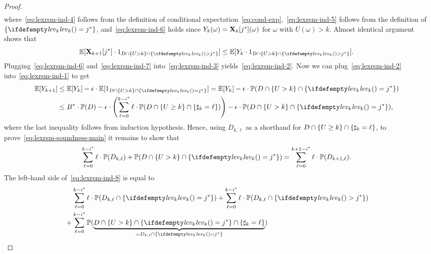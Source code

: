 \begin{proof}
\begin{align}
\end{align}
where~\eqref{eq:lexrsm-ind-4} follows from the definition of conditional expectation~\eqref{eq:cond-exp},~\eqref{eq:lexrsm-ind-5} follows from the definition of $\{\levelrank{}{k}=\fixn{j}\}$, and~\eqref{eq:lexrsm-ind-6} holds since $Y_k(\omega)=\mathbf{X}_{k}[{j}^*](\omega)$ for $\omega$ with $U(\omega)> k$. Almost identical argument shows that
\begin{equation}
\label{eq:lexrsm-ind-7}
\E[\vecseq{X}{k+1}{\fixn{j}}\cdot \indicator{D\cap \{U > k \} \cap \{\levelrank{}{k}>\fixn{j} \} }] \leq \E[Y_k\cdot \indicator{D\cap \{U > k \} \cap \{\levelrank{}{k}>\fixn{j} \}}].
\end{equation}
Plugging~\eqref{eq:lexrsm-ind-6} and~\eqref{eq:lexrsm-ind-7} into~\eqref{eq:lexrsm-ind-3} yields~\eqref{eq:lexrsm-ind-2}. Now we can plug~\eqref{eq:lexrsm-ind-2} into~\eqref{eq:lexrsm-ind-1} to get
\begin{align}
\E[Y_{k+1}]&\leq \E[Y_k] - \eps\cdot \E[\indicator{D \cap \{U>k\} \cap \{\levelrank{}{k} = \fixn{j} \} }] = \E[Y_k] - \eps\cdot \probm(D \cap \{U>k\} \cap \{\levelrank{}{k} = \fixn{j} \} ) \nonumber\\
&\leq \fixn{B}\cdot \probm(D) - \eps\cdot\left(\sum_{\ell=0}^{k-\fixn{i}} \ell\cdot\probm(D 
\cap \{U\geq k\} \cap \{\noofdec_k = \ell\})\right) -\eps\cdot \probm(D \cap \{U>k\} \cap \{\levelrank{}{k} = \fixn{j} \}),
\end{align}
where the last inequality follows from induction hypothesis. Hence, using $D_{k,\ell}$ as a shorthand for $D 
\cap \{U\geq k\} \cap \{\sharp_k = \ell\}$, to prove~\eqref{eq:lexrsm-soundness-main} it remains to show that
\begin{equation}
\label{eq:lexrsm-ind-8}
\sum_{\ell=0}^{k-\fixn{i}} \ell\cdot\probm(D_{k,\ell}) + \probm(D \cap \{U>k\} \cap \{\levelrank{}{k} = \fixn{j} \}) = \sum_{\ell=0}^{k+1-\fixn{i}} \ell\cdot\probm(D_{k+1,\ell}).
\end{equation}
The left-hand side of~\eqref{eq:lexrsm-ind-8} is equal to
\begin{align}
&\phantom{+}\;\sum_{\ell=0}^{k-\fixn{i}} \ell\cdot\probm(D_{k,\ell} \cap \{\levelrank{}{k}=\fixn{j}\}) + \sum_{\ell=0}^{k-\fixn{i}} \ell\cdot\probm(D_{k,\ell}\cap \{\levelrank{}{k}>\fixn{j}\} )\nonumber \\ 
&+\sum_{\ell=0}^{k-\fixn{i}}\probm(\underbrace{D \cap \{U>k\} \cap \{\levelrank{}{k} = \fixn{j}\} \cap \{\noofdec_k = \ell\}}_{=D_{k,\ell} \cap \{\levelrank{}{k} = \fixn{j}\}})
\nonumber \\

\end{align}
\end{proof}
